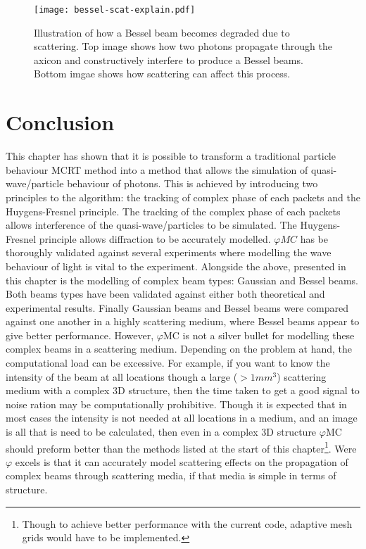 \begin{figure}[!htbp]
    \centering
    \texttt{[image: bessel-scat-explain.pdf]}
    \caption{Illustration of how a Bessel beam becomes degraded due to scattering. Top image shows how two photons propagate through the axicon and constructively interfere to produce a Bessel beams. Bottom imgae shows how scattering can affect this process.}
    \label{fig:bessel-scat-explain}
\end{figure}



\section{Conclusion}

This chapter has shown that it is possible to transform a traditional particle behaviour MCRT method into a method that allows the simulation of quasi-wave/particle behaviour of photons.
This is achieved by introducing two principles to the algorithm: the tracking of complex phase of each packets and the Huygens-Fresnel principle.
The tracking of the complex phase of each packets allows interference of the quasi-wave/particles to be simulated.
The Huygens-Fresnel principle allows diffraction to be accurately modelled.
$\varphi MC$ has be thoroughly validated against several experiments where modelling the wave behaviour of light is vital to the experiment.
Alongside the above, presented in this chapter is the modelling of complex beam types: Gaussian and Bessel beams.
Both beams types have been validated against either both theoretical and experimental results.
Finally Gaussian beams and Bessel beams were compared against one another in a highly scattering medium, where Bessel beams appear to give better performance.
However, $\varphi$MC is not a silver bullet for modelling these complex beams in a scattering medium.
Depending on the problem at hand, the computational load can be excessive.
For example, if you want to know the intensity of the beam at all locations though a large ($> 1mm^3$) scattering medium with a complex 3D structure, then the time taken to get a good signal to noise ration may be computationally prohibitive.
Though it is expected that in most cases the intensity is not needed at all locations in a medium, and an image is all that is need to be calculated, then even in a complex 3D structure $\varphi$MC should preform better than the methods listed at the start of this chapter\footnote{Though to achieve better performance with the current code, adaptive mesh grids would have to be implemented.}.
Were $\varphi$ excels is that it can accurately model scattering effects on the propagation of complex beams through scattering media, if that media is simple in terms of structure.

